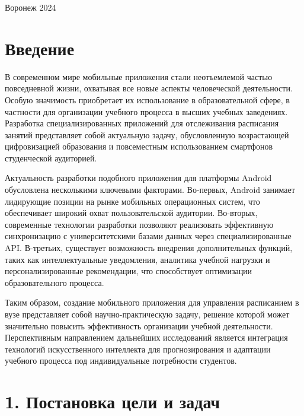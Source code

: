 \documentclass{vsureport}
\begin{document}
\begin{center} Воронеж 2024 \end{center} 

\thispagestyle{empty} %

\newpage
\thispagestyle{empty} %
\tableofcontents

\newpage
\section*{Введение}

В современном мире мобильные приложения стали неотъемлемой частью повседневной жизни, охватывая все новые аспекты человеческой деятельности. Особую значимость приобретает их использование в образовательной сфере, в частности для организации учебного процесса в высших учебных заведениях. Разработка специализированных приложений для отслеживания расписания занятий представляет собой актуальную задачу, обусловленную возрастающей цифровизацией образования и повсеместным использованием смартфонов студенческой аудиторией.

Актуальность разработки подобного приложения для платформы Android обусловлена несколькими ключевыми факторами. Во-первых, Android занимает лидирующие позиции на рынке мобильных операционных систем, что обеспечивает широкий охват пользовательской аудитории. Во-вторых, современные технологии разработки позволяют реализовать эффективную синхронизацию с университетскими базами данных через специализированные API. В-третьих, существует возможность внедрения дополнительных функций, таких как интеллектуальные уведомления, аналитика учебной нагрузки и персонализированные рекомендации, что способствует оптимизации образовательного процесса. \cite{ref1}

Таким образом, создание мобильного приложения для управления расписанием в вузе представляет собой научно-практическую задачу, решение которой может значительно повысить эффективность организации учебной деятельности. Перспективным направлением дальнейших исследований является интеграция технологий искусственного интеллекта для прогнозирования и адаптации учебного процесса под индивидуальные потребности студентов.


\newpage

\section*{1. Постановка цели и задач}
\end{document}
